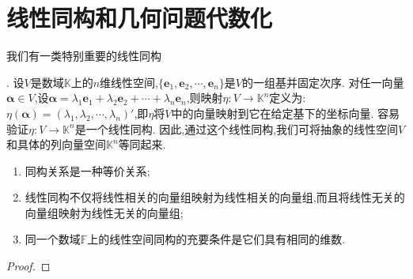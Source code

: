 \documentclass[../../main.tex]{subfiles}%
\begin{document}
\section{线性同构和几何问题代数化}

\hypertarget{线性同构1}{我们有一类特别重要的线性同构}. 设\(V\)是数域\(\mathbb{K}\)上的\(n\)维线性空间,\(\{\boldsymbol{e}_1,\boldsymbol{e}_2,\cdots,\boldsymbol{e}_n\}\)是\(V\)的一组基并固定次序. 对任一向量\(\boldsymbol{\alpha}\in V\),设\(\boldsymbol{\alpha}=\lambda_1\boldsymbol{e}_1+\lambda_2\boldsymbol{e}_2+\cdots+\lambda_n\boldsymbol{e}_n\),则映射\(\eta:V\to\mathbb{K}^n\)定义为:\(\eta(\boldsymbol{\alpha})=(\lambda_1,\lambda_2,\cdots,\lambda_n)'\),即\(\eta\)将\(V\)中的向量映射到它在给定基下的坐标向量. 容易验证\(\eta:V\to\mathbb{K}^n\)是一个线性同构. 因此,通过这个线性同构,我们可将抽象的线性空间\(V\)和具体的列向量空间\(\mathbb{K}^n\)等同起来.

\begin{theorem}\label{theorem:线性空间的同构}
\begin{enumerate}[(1)]
\item 同构关系是一种等价关系;
\item 线性同构不仅将线性相关的向量组映射为线性相关的向量组,而且将线性无关的向量组映射为线性无关的向量组;
\item 同一个数域\(\mathbb{F}\)上的线性空间同构的充要条件是它们具有相同的维数.
\end{enumerate}
\end{theorem}
\begin{proof}



\end{proof}
\end{document}
